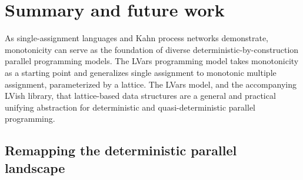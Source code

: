 \chapter{Summary and future work}\label{ch:conclusion} %

As single-assignment languages and Kahn process networks demonstrate,
monotonicity can serve as the foundation of diverse
deterministic-by-construction parallel programming models.  The LVars
programming model takes monotonicity as a starting point and
generalizes single assignment to monotonic multiple assignment,
parameterized by a lattice.  The LVars model, and the accompanying
LVish library,  that lattice-based data structures are
a general and practical unifying abstraction for deterministic and
quasi-deterministic parallel  programming.

\ifdefined\DISSERTATION
\section{Remapping the deterministic parallel landscape}
\fi

